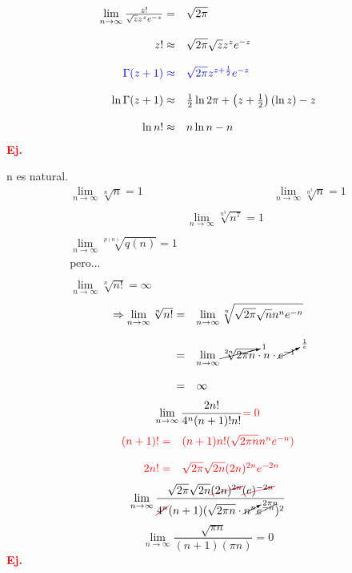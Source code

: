 \documentclass{article}
\theoremstyle{definition}
\begin{document}
\[
\begin{array}{rl}
	\lim\limits_{n\to \infty}\frac{z!}{\sqrt{z}z^ze^{-z}}=& \sqrt{2\pi}\\
	\\
	z!\approx &\sqrt{2\pi}\sqrt{z}z^ze^{-z}\\
	\\
	\textcolor{blue}{\Gamma (z+1)\approx} & \textcolor{blue}{\sqrt{2\pi} z^{z+\frac{1}{2}}e^{-z}}\\
	\\
	\ln \Gamma (z+1) \approx & \frac{1}{2} \ln 2\pi +\left( z+\frac{1}{2}\right)(\ln z)-z\\
	\\
	\ln n! \approx & n\ln n - n 
\end{array}
\]
\textbf{\textcolor{red}{Ej.}}

n es natural.
\[
\begin{array}{lcr}
	\lim\limits_{n\to \infty} \sqrt[n]{n}=1 && \lim\limits_{n\to \infty} \sqrt[n^3]{n}=1\\
	\\
	&\lim\limits_{n\to \infty} \sqrt[n^3]{n^7}=1\\
	\\
	\lim\limits_{n\to \infty} \sqrt[p(n)]{q(n)}=1\\
	\\
	\text{pero...}\\
	\\
	\lim\limits_{n\to \infty} \sqrt[n]{n!}=\infty
\end{array}
\]
\[
\begin{array}{rl}
	\Rightarrow \lim\limits_{n\to \infty} \sqrt[n]{n!}=& \lim\limits_{n\to \infty}\sqrt[n]{\sqrt{2\pi}\sqrt{n}n^ne^{-n}}\\
	\\
	=& \lim\limits_{n\to \infty} \cancelto{1}{\sqrt[2n]{2\pi n}}\cdot n\cdot \cancelto{\frac{1}{e}}{e^{-1}}\\
	\\
	=& \infty
\end{array}
\]
\[\lim\limits_{n\to \infty} \frac{2n!}{4^n(n+1)!n!}\textcolor{red}{=0}\]
\[\textcolor{red}{
\begin{array}{rl}
	(n+1)!=& (n+1)n!(\sqrt{2\pi n } n^n e^{-n})\\
	\\
	2n!=& \sqrt{2\pi}\sqrt{2n}(2n)^{2n}e^{-2n}
\end{array}
}\]
\[\lim\limits_{n\to \infty}\frac{\sqrt{2\pi} \sqrt{2n}\textcolor{red}{\cancel{\textcolor{black}{(2n)^{2n}}}\cancel{\textcolor{black}{(e)^{-2n}}}}}{\textcolor{red}{\cancel{\textcolor{black}{4^n}}}(n+1)(\sqrt{2\pi n}\cdot \cancelto{2\pi n}{n^n}\cancel{e^{-n}})^2}\]
\[\lim\limits_{n\to \infty} \frac{\sqrt{\pi n}}{(n+1)(\pi n)}=0\]
\textbf{\textcolor{red}{Ej.}}
\end{document}

